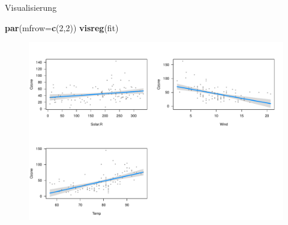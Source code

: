 \documentclass[ignorenonframetext,]{beamer}
\newenvironment{Shaded}{}{}
\newcommand{\KeywordTok}[1]{\textcolor[rgb]{0.00,0.44,0.13}{\textbf{{#1}}}}
\newcommand{\DataTypeTok}[1]{\textcolor[rgb]{0.56,0.13,0.00}{{#1}}}
\newcommand{\DecValTok}[1]{\textcolor[rgb]{0.25,0.63,0.44}{{#1}}}
\newcommand{\NormalTok}[1]{{#1}}
\begin{document}
\begin{frame}[fragile]{Visualisierung}

\begin{Shaded}
\begin{Highlighting}[]
\KeywordTok{par}\NormalTok{(}\DataTypeTok{mfrow=}\KeywordTok{c}\NormalTok{(}\DecValTok{2}\NormalTok{,}\DecValTok{2}\NormalTok{))}
\KeywordTok{visreg}\NormalTok{(fit)}
\end{Highlighting}
\end{Shaded}

\begin{figure}[htbp]
\centering
\includegraphics{RSocialScience2_files/figure-beamer/unnamed-chunk-79-1.pdf}
\caption{}
\end{figure}

\end{frame}
\end{document}
